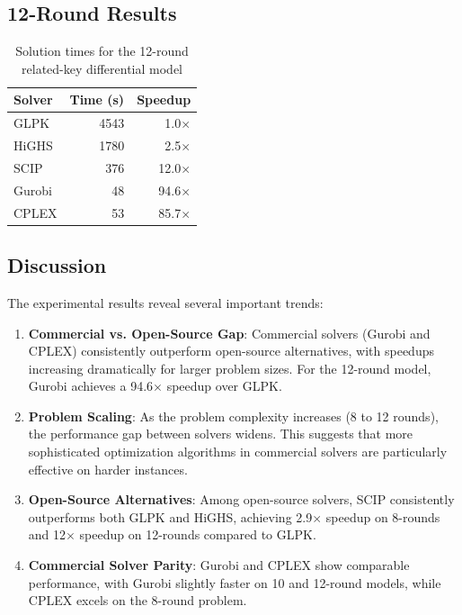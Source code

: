 \documentclass[11pt,a4paper]{article}
\begin{document}
\subsection{12-Round Results}

\begin{table}[ht]
  \centering
  \caption{Solution times for the 12-round related-key differential model}
  \label{tab:12round}
  \begin{tabular}{lrr}
    \toprule
    Solver  & Time (s) & Speedup \\
    \midrule
    GLPK   & 4543 & 1.0$\times$ \\
    HiGHS  & 1780 & 2.5$\times$ \\
    SCIP   & 376  & 12.0$\times$ \\
    Gurobi & 48   & 94.6$\times$ \\
    CPLEX  & 53   & 85.7$\times$ \\
    \bottomrule
  \end{tabular}
\end{table}

\subsection{Discussion}

The experimental results reveal several important trends:

\begin{enumerate}
    \item \textbf{Commercial vs. Open-Source Gap}: Commercial solvers (Gurobi and CPLEX) consistently outperform open-source alternatives, with speedups increasing dramatically for larger problem sizes. For the 12-round model, Gurobi achieves a 94.6$\times$ speedup over GLPK.
    
    \item \textbf{Problem Scaling}: As the problem complexity increases (8 to 12 rounds), the performance gap between solvers widens. This suggests that more sophisticated optimization algorithms in commercial solvers are particularly effective on harder instances.
    
    \item \textbf{Open-Source Alternatives}: Among open-source solvers, SCIP consistently outperforms both GLPK and HiGHS, achieving 2.9$\times$ speedup on 8-rounds and 12$\times$ speedup on 12-rounds compared to GLPK.
    
    \item \textbf{Commercial Solver Parity}: Gurobi and CPLEX show comparable performance, with Gurobi slightly faster on 10 and 12-round models, while CPLEX excels on the 8-round problem.
\end{enumerate}
\end{document}
